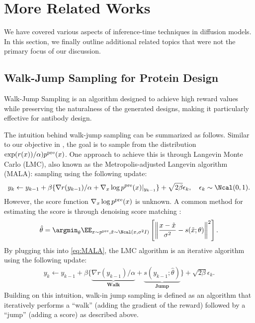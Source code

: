 \section{More Related Works} \label{sec:related_works}


We have covered various aspects of inference-time techniques in diffusion models. In this section, we finally outline additional related topics that were not the primary focus of our discussion.


\subsection{Walk-Jump Sampling for Protein Design}\label{sec:refinement}

Walk-Jump Sampling \citep{frey2023protein,saremi2019neural} is an algorithm designed to achieve high reward values while preserving the naturalness of the generated designs, making it particularly effective for antibody design. 

The intuition behind walk-jump sampling can be summarized as follows. Similar to our objective in ,  the goal is to sample from the distribution $\exp(r(x))/\alpha )p^{\mathrm{pre}}(x)$. One approach to achieve this is through Langevin Monte Carlo (LMC), also known as the Metropolis-adjusted Langevin algorithm (MALA): sampling using the following update: 
{ \begin{align}\label{eq:MALA}
    y_{k} \leftarrow  y_{k-1} +  \beta\{\nabla r(y_{k-1})/\alpha  + \nabla_{x} \log p^{\pre}(x)|_{y_{k-1}} \} + \sqrt{2\beta}\epsilon_k,\quad \epsilon_k\sim \Ncal(0,1).
\end{align}
} 
 However, the score function $\nabla_{x} \log p^{\mathrm{pre}}(x)$ is unknown. A common method for estimating the score is through denoising score matching \citep{vincent2011connection}: 
\begin{align*}
   \hat \theta= \argmin_{\theta} \EE_{x\sim p^{\pre},\tilde x \sim \Ncal(x,\sigma^2 I)}\left[ \left \|\frac{x-\tilde x}{\sigma^2} - s(\tilde x;\theta) \right \|^2 \right ]. 
\end{align*}
By plugging this into \eqref{eq:MALA}, the LMC algorithm is an iterative algorithm using the following update: 
\begin{align}\label{eq:MALA2}
    y_{k} \leftarrow y_{k-1}  + \beta \{ \underbrace{ \nabla r(y_{k-1})/\alpha}_{\textbf{Walk}} +  \underbrace{s(y_{k-1};\hat \theta)}_{\textbf{Jump} } \} + \sqrt{2\beta}\epsilon_k. 
\end{align}
{ Building on this intuition, walk-in jump sampling is defined as an algorithm that iteratively performs a ``walk'' (adding the gradient of the reward) followed by a ``jump'' (adding a score) as described above.} 


